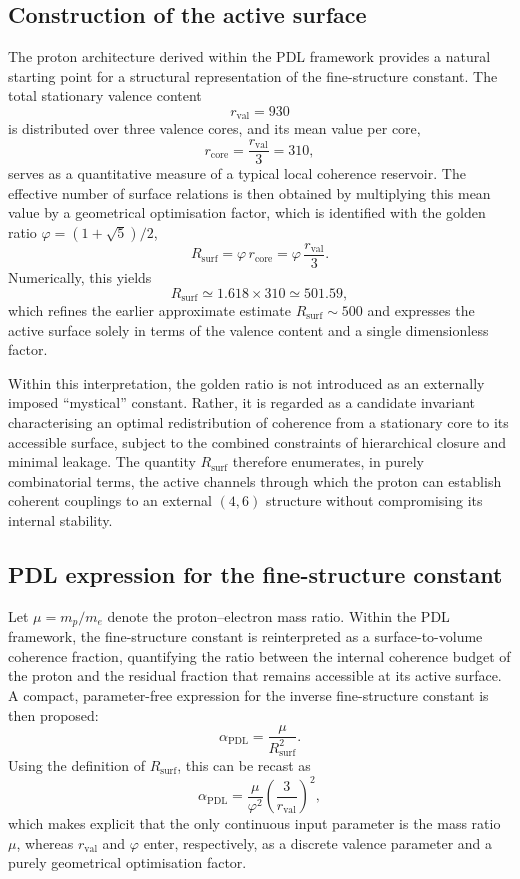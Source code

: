 \documentclass[12pt,a4paper]{article}
\begin{document}
\subsection{Construction of the active surface}

The proton architecture derived within the PDL framework provides a natural starting point for a structural representation of the fine-structure constant.
The total stationary valence content
\[
  r_{\text{val}} = 930
\]
is distributed over three valence cores, and its mean value per core,
\[
  r_{\text{core}} = \frac{r_{\text{val}}}{3} = 310,
\]
serves as a quantitative measure of a typical local coherence reservoir.
The effective number of surface relations is then obtained by multiplying this mean value by a geometrical optimisation factor, which is identified with the golden ratio \(\varphi = (1+\sqrt{5})/2\),
\[
  R_{\text{surf}} = \varphi\,r_{\text{core}} = \varphi\,\frac{r_{\text{val}}}{3}.
\]
Numerically, this yields
\[
  R_{\text{surf}} \simeq 1.618\times 310 \simeq 501.59,
\]
which refines the earlier approximate estimate \(R_{\text{surf}}\sim 500\) and expresses the active surface solely in terms of the valence content and a single dimensionless factor.\cite{Laubscher2026LDP_French,Laubscher2026PDL_English}

Within this interpretation, the golden ratio is not introduced as an externally imposed “mystical” constant.
Rather, it is regarded as a candidate invariant characterising an optimal redistribution of coherence from a stationary core to its accessible surface, subject to the combined constraints of hierarchical closure and minimal leakage.
The quantity \(R_{\text{surf}}\) therefore enumerates, in purely combinatorial terms, the active channels through which the proton can establish coherent couplings to an external \((4,6)\) structure without compromising its internal stability.

\subsection{PDL expression for the fine-structure constant}

Let \(\mu = m_p/m_e\) denote the proton–electron mass ratio.
Within the PDL framework, the fine-structure constant is reinterpreted as a surface-to-volume coherence fraction, quantifying the ratio between the internal coherence budget of the proton and the residual fraction that remains accessible at its active surface.
A compact, parameter-free expression for the inverse fine-structure constant is then proposed:
\[
  \alpha_{\text{PDL}}
  =
  \frac{\mu}{R_{\text{surf}}^2}.
\]
Using the definition of \(R_{\text{surf}}\), this can be recast as
\[
  \alpha_{\text{PDL}}
  =
  \frac{\mu}{\varphi^2}\left(\frac{3}{r_{\text{val}}}\right)^2,
\]
which makes explicit that the only continuous input parameter is the mass ratio \(\mu\), whereas \(r_{\text{val}}\) and \(\varphi\) enter, respectively, as a discrete valence parameter and a purely geometrical optimisation factor.\cite{Laubscher2026PDL_English,Laubscher2026LDP_French}
\end{document}

